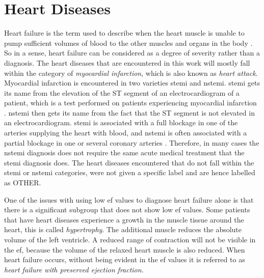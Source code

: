 \section{Heart Diseases}

Heart failure is the term used to describe when the heart muscle is unable to pump sufficient volumes of blood to the other muscles and organs in the body \cite{medicine_net}. So in a sense, heart failure can be considered as a degree of severity rather than a diagnosis. The heart diseases that are encountered in this work will mostly fall within the category of \textit{myocardial infarction}, which is also known as \textit{heart attack}. Myocardial infarction is encountered in two varieties \acrfull{stemi} and \acrfull{nstemi}. \acrshort{stemi} gets its name from the elevation of the ST segment of an electrocardiogram of a patient, which is a test performed on patients experiencing myocardial infarction \cite{ecg_stemi}. \acrshort{nstemi} then gets its name from the fact that the ST segment is not elevated in an electrocardiogram. \acrshort{stemi} is associated with a full blockage in one of the arteries supplying the heart with blood, and \acrshort{nstemi} is often associated with a partial blockage in one or several coronary arteries \cite{ambulanseforum}. Therefore, in many cases the \acrshort{nstemi} diagnosis does not require the same acute medical treatment that the \acrshort{stemi} diagnosis does. The heart diseases encountered that do not fall within the \acrshort{stemi} or \acrshort{nstemi} categories, were not given a specific label and are hence labelled as OTHER. \bigskip

One of the issues with using low \acrshort{ef} values to diagnose heart failure alone is that there is a significant subgroup that does not show low \acrshort{ef} values. Some patients that have heart diseases experience a growth in the muscle tissue around the heart, this is called \textit{hypertrophy}. The additional muscle reduces the absolute volume of the left ventricle. A reduced range of contraction will not be visible in the \acrshort{ef}, because the volume of the relaxed heart muscle is also reduced. When heart failure occurs, without being evident in the \acrshort{ef} values it is referred to as \textit{heart failure with preserved ejection fraction}. \bigskip

